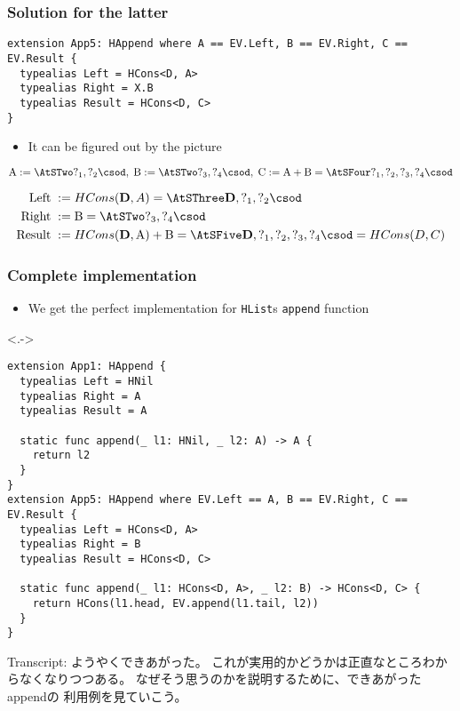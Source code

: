 \begin{frame}[fragile]
  \frametitle{Solution for the latter}

\begin{lstlisting}[style=swift]
extension App5: HAppend where A == EV.Left, B == EV.Right, C == EV.Result {
  typealias Left = HCons<D, A>
  typealias Right = X.B
  typealias Result = HCons<D, C>
}
\end{lstlisting}

  \begin{itemize}
    \item It can be figured out by the picture
  \end{itemize}

  \pause
  \[
    \text{A} := \STwo{?_1, ?_2},\; \text{B} := \STwo{?_3, ?_4},\; \text{C} := \text{A} + \text{B} = \SFour{?_1, ?_2, ?_3, ?_4}
  \]

  \pause
  \begin{align*}
    \text{Left}\; &:= HCons(\mathbf{D}, A) = \SThree{\mathbf{D}, ?_1, ?_2} \\
    \text{Right}\; &:= \text{B} = \STwo{?_3, ?_4} \\
    \text{Result}\; &:= HCons(\mathbf{D}, \text{A}) + \text{B} = \SFive{\mathbf{D}, ?_1, ?_2, ?_3, ?_4} = HCons(D, C)
  \end{align*}
\end{frame}

\begin{frame}[fragile]
  \frametitle{Complete implementation}

  \begin{itemize}
    \item<+-> We get the perfect implementation for \lstinline|HList|s \lstinline|append| function
  \end{itemize}

  \begin{uncoverenv}<.->
\begin{lstlisting}[style=swift]
extension App1: HAppend {
  typealias Left = HNil
  typealias Right = A
  typealias Result = A
   
  static func append(_ l1: HNil, _ l2: A) -> A {
    return l2
  }
}
extension App5: HAppend where EV.Left == A, B == EV.Right, C == EV.Result {
  typealias Left = HCons<D, A>
  typealias Right = B
  typealias Result = HCons<D, C>
   
  static func append(_ l1: HCons<D, A>, _ l2: B) -> HCons<D, C> {
    return HCons(l1.head, EV.append(l1.tail, l2))
  }
}
\end{lstlisting}
  \end{uncoverenv}

  \begin{notes}
    \item Transcript:
    ようやくできあがった。
    これが実用的かどうかは正直なところわからなくなりつつある。
    なぜそう思うのかを説明するために、できあがったappendの
    利用例を見ていこう。
  \end{notes}
\end{frame}

